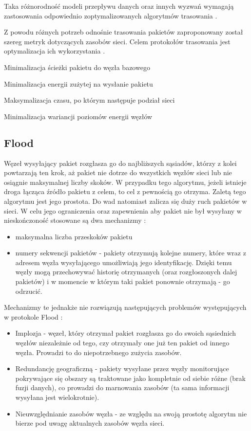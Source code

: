 
Taka różnorodność modeli przepływu danych oraz innych wyzwań wymagają zastosowania odpowiednio zoptymalizowanych algorytmów trasowania \cite{Abdullah2014, Sohraby2006}.

Z powodu różnych potrzeb odnośnie trasowania pakietów zaproponowany został szereg metryk dotyczących zasobów sieci. Celem protokołów trasowania jest optymalizacja ich wykorzystania \cite{Dargie2010, Biradar2009}.

Minimalizacja ścieżki pakietu do węzła bazowego

Minimalizacja energii zużytej na wysłanie pakietu

Maksymalizacja czasu, po którym następuje podział sieci

Minimalizacja wariancji poziomów energii węzłów


\subsection{Flood}
Węzeł wysyłający pakiet rozgłasza go do najbliższych sąsiadów, którzy z kolei powtarzają ten krok, aż pakiet nie dotrze do wszystkich węzłów sieci lub nie osiągnie maksymalnej liczby skoków.
W przypadku tego algorytmu, jeżeli istnieje droga łącząca źródło pakietu z celem, to cel z pewnością go otrzyma.
Zaletą tego algorytmu jest jego prostota. Do wad natomiast zalicza się duży ruch pakietów w sieci. W celu jego ograniczenia oraz zapewnienia aby pakiet nie był wysyłany w nieskończoność stosowane są dwa mechanizmy \cite{Dargie2010}:
\begin{itemize}
	\item maksymalna liczba przeskoków pakietu
	\item numery sekwencji pakietów - pakiety otrzymują kolejne numery, które wraz z adresem węzła wysyłającego umożliwiają jego identyfikację. Dzięki temu węzły mogą przechowywać historię otrzymanych (oraz rozgłoszonych dalej pakietów) i w momencie w którym taki pakiet ponownie otrzymają - go odrzucić.
\end{itemize}

Mechanizmy te jednakże nie rozwiązują następujących problemów występujących w protokole Flood \cite{Dargie2010}:
\begin{itemize}
	\item Implozja - węzeł, który otrzymał pakiet rozgłasza go do swoich sąsiednich węzłów niezależnie od tego, czy otrzymały one już ten pakiet od innego węzła. Prowadzi to do niepotrzebnego zużycia zasobów. %
	\item Redundancję geograficzną - pakiety wysyłane przez węzły monitorujące pokrywające się obszary są traktowane jako kompletnie od siebie różne (brak fuzji danych), co prowadzi do marnowania zasobów (ta sama informacji wysyłana jest wielokrotnie). %
	\item Nieuwzględnianie zasobów węzła - ze względu na swoją prostotę algorytm nie bierze pod uwagę aktualnych zasobów węzła sieci.
\end{itemize}
